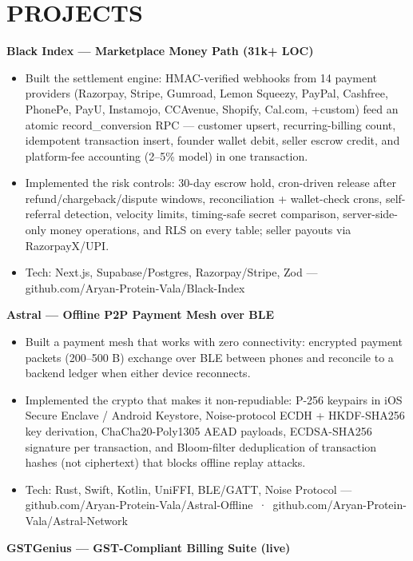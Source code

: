 \documentclass[9pt]{article}
\begin{document}
\section*{PROJECTS}
\textbf{Black Index  ---  Marketplace Money Path (31k+ LOC)}
\vspace{1pt}
\begin{itemize}[leftmargin=11pt,itemsep=0pt,topsep=1pt,parsep=0pt]
\item Built the settlement engine: HMAC-verified webhooks from 14 payment providers (Razorpay, Stripe, Gumroad, Lemon Squeezy, PayPal, Cashfree, PhonePe, PayU, Instamojo, CCAvenue, Shopify, Cal.com, +custom) feed an atomic record\_conversion RPC  ---  customer upsert, recurring-billing count, idempotent transaction insert, founder wallet debit, seller escrow credit, and platform-fee accounting (2–5\% model) in one transaction.
\item Implemented the risk controls: 30-day escrow hold, cron-driven release after refund/chargeback/dispute windows, reconciliation + wallet-check crons, self-referral detection, velocity limits, timing-safe secret comparison, server-side-only money operations, and RLS on every table; seller payouts via RazorpayX/UPI.
\item Tech: Next.js, Supabase/Postgres, Razorpay/Stripe, Zod  ---  github.com/Aryan-Protein-Vala/Black-Index
\end{itemize}
\textbf{Astral  ---  Offline P2P Payment Mesh over BLE}
\vspace{1pt}
\begin{itemize}[leftmargin=11pt,itemsep=0pt,topsep=1pt,parsep=0pt]
\item Built a payment mesh that works with zero connectivity: encrypted payment packets (200–500 B) exchange over BLE between phones and reconcile to a backend ledger when either device reconnects.
\item Implemented the crypto that makes it non-repudiable: P-256 keypairs in iOS Secure Enclave / Android Keystore, Noise-protocol ECDH + HKDF-SHA256 key derivation, ChaCha20-Poly1305 AEAD payloads, ECDSA-SHA256 signature per transaction, and Bloom-filter deduplication of transaction hashes (not ciphertext) that blocks offline replay attacks.
\item Tech: Rust, Swift, Kotlin, UniFFI, BLE/GATT, Noise Protocol  ---  github.com/Aryan-Protein-Vala/Astral-Offline \,·\, github.com/Aryan-Protein-Vala/Astral-Network
\end{itemize}
\textbf{GSTGenius  ---  GST-Compliant Billing Suite (live)}
\vspace{1pt}
\end{document}
